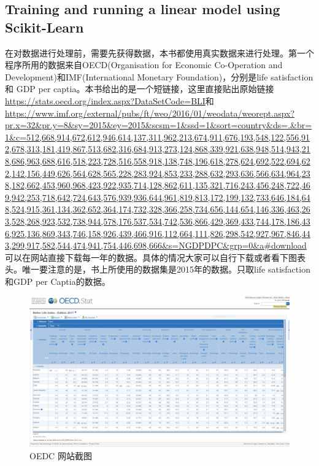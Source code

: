 \documentclass[UTF8]{ctexart}
\begin{document}
\subsection{Training and running a linear model using Scikit-Learn}
在对数据进行处理前，需要先获得数据，本书都使用真实数据来进行处理。第一个程序所用的数据来自OECD(Organisation for Economic Co-Operation and Development)和IMF(International Monetary Foundation)，分别是life satisfaction 和 GDP per captia。本书给出的是一个短链接，这里直接贴出原始链接\url{ https://stats.oecd.org/index.aspx?DataSetCode=BLI}和
\url{https://www.imf.org/external/pubs/ft/weo/2016/01/weodata/weorept.aspx?pr.x=32&pr.y=8&sy=2015&ey=2015&scsm=1&ssd=1&sort=country&ds=.&br=1&c=512,668,914,672,612,946,614,137,311,962,213,674,911,676,193,548,122,556,912,678,313,181,419,867,513,682,316,684,913,273,124,868,339,921,638,948,514,943,218,686,963,688,616,518,223,728,516,558,918,138,748,196,618,278,624,692,522,694,622,142,156,449,626,564,628,565,228,283,924,853,233,288,632,293,636,566,634,964,238,182,662,453,960,968,423,922,935,714,128,862,611,135,321,716,243,456,248,722,469,942,253,718,642,724,643,576,939,936,644,961,819,813,172,199,132,733,646,184,648,524,915,361,134,362,652,364,174,732,328,366,258,734,656,144,654,146,336,463,263,528,268,923,532,738,944,578,176,537,534,742,536,866,429,369,433,744,178,186,436,925,136,869,343,746,158,926,439,466,916,112,664,111,826,298,542,927,967,846,443,299,917,582,544,474,941,754,446,698,666&s=NGDPDPC&grp=0&a#download}
可以在网站直接下载每一年的数据。具体的情况大家可以自行下载或者看下图表头。唯一要注意的是，书上所使用的数据集是2015年的数据。只取life satisfaction和GDP per Captia的数据。
\begin{figure}[H]
\centering
\includegraphics[width = 6in]{oedc.jpg}
\caption{OEDC 网站截图}
\end{figure}
\end{document}
